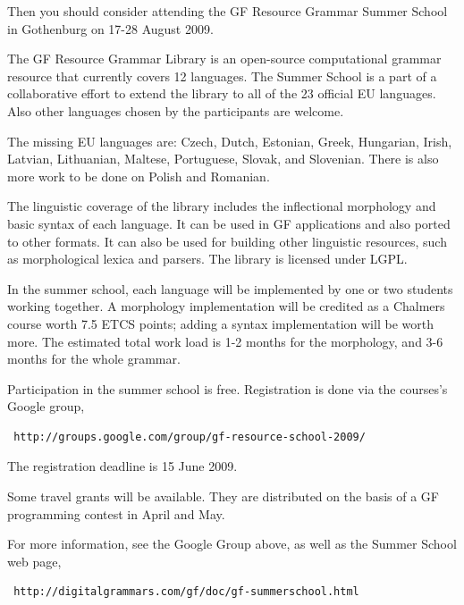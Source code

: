 \documentclass[12pt]{article}
\begin{document}
Then you should consider attending the GF Resource Grammar Summer School 
in Gothenburg on 17-28 August 2009.

The GF Resource Grammar Library is an open-source computational grammar resource
that currently covers 12 languages. The Summer School is a part of a 
collaborative effort to extend the library to all of the 23 official 
EU languages. Also other languages chosen by the participants are welcome.

The missing EU languages are: 
Czech, Dutch, Estonian, Greek, Hungarian, Irish, Latvian, Lithuanian,
Maltese, Portuguese, Slovak, and Slovenian. There is also more work to
be done on Polish and Romanian.

The linguistic coverage of the library includes the inflectional morphology
and basic syntax of each language. It can be used in GF applications
and also ported to other formats. It can also be used for building other
linguistic resources, such as morphological lexica and parsers.
The library is licensed under LGPL.

In the summer school, each language will be implemented by one or two students
working together. A morphology implementation will be credited
as a Chalmers course worth 7.5 ETCS points; adding a syntax implementation
will be worth more. The estimated total work load is 1-2 months for the
morphology, and 3-6 months for the whole grammar.

Participation in the summer school is free. 
Registration is done via the courses's Google group,

\begin{verbatim}
 http://groups.google.com/group/gf-resource-school-2009/
\end{verbatim}
The registration deadline is 15 June 2009.

Some travel grants will be available. They are distributed on the basis of a
GF programming contest in April and May.

For more information, see the Google Group above, as well as the 
Summer School web page,

\begin{verbatim}
 http://digitalgrammars.com/gf/doc/gf-summerschool.html
\end{verbatim}

\end{document}
